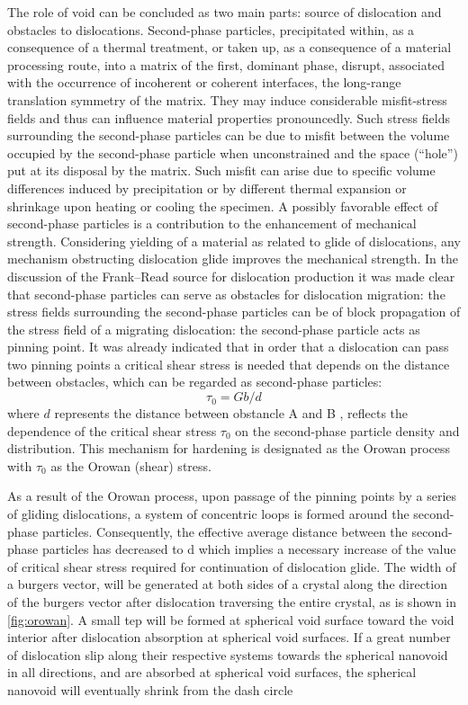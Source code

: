 \documentclass[metals,article,submit,moreauthors,pdftex,10pt,a4paper]{Definitions/mdpi}
\begin{document}
The role of void can be concluded as two main parts: source of dislocation and obstacles to dislocations.  Second-phase particles, precipitated within, as a consequence of a thermal treatment, or taken up, as a consequence of a material processing route, into a matrix of the first, dominant phase, disrupt, associated with the occurrence of incoherent or coherent interfaces, the long-range translation symmetry of the matrix. They may induce considerable misfit-stress fields and thus can influence material properties pronouncedly. Such stress fields surrounding the second-phase particles can be due to misfit between the volume occupied by the second-phase particle when unconstrained and the space (“hole”) put at its disposal by the matrix. Such misfit can arise due to specific volume differences induced by precipitation or by different thermal expansion or shrinkage upon heating or cooling the specimen. A possibly favorable effect of second-phase particles is a contribution to the enhancement of mechanical strength. Considering yielding of a material as related to glide of dislocations, any mechanism obstructing dislocation glide improves the mechanical strength. In the discussion of the Frank–Read source for dislocation production  it was made clear that second-phase particles can serve as obstacles for dislocation migration: the stress fields surrounding the second-phase particles can be of block propagation of the stress field of a migrating dislocation: the second-phase particle acts as pinning point. It was already indicated that in order that a dislocation can pass two pinning points a critical shear stress is needed that depends on the distance between  obstacles, which can be regarded as second-phase particles:
\begin{equation} \label{eq:orowan} 
\tau_0 = Gb/d
\end{equation}
where $d$ represents the distance between obstancle A and B , reflects the dependence of the critical shear stress $\tau_0$ on the second-phase particle density and distribution. This mechanism for hardening is designated as the Orowan process with $\tau_0$ as the Orowan (shear) stress.

As a result of the Orowan process, upon passage of the pinning points by a series of gliding dislocations, a system of concentric loops is formed around the second-phase particles. Consequently, the effective average distance between the second-phase particles has decreased to d which implies a necessary increase of the value of critical shear stress required for continuation of dislocation glide. The width of a burgers vector, will be generated at both sides of a crystal along the direction of the burgers vector after dislocation traversing the entire crystal, as is shown in \ref{fig:orowan}. A small tep will be formed at spherical void surface toward the void interior after dislocation absorption at spherical void surfaces. If a great number of dislocation slip along their respective systems towards the spherical nanovoid in all directions, and are absorbed at spherical void surfaces, the spherical nanovoid will eventually shrink from the dash circle 
\end{document}
